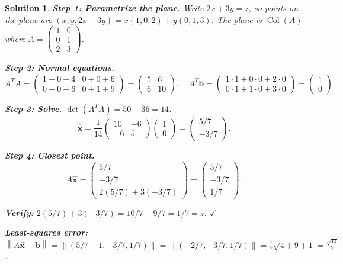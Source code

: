 \documentclass[11pt,a4paper]{article}
\theoremstyle{sol}
\newtheorem*{solution}{Solution}
\newcommand{\hx}{\hat{\mathbf{x}}}
\newcommand{\norm}[1]{\left\|#1\right\|}
\begin{document}
\begin{solution}
\textbf{Step 1: Parametrize the plane.}
Write $2x+3y=z$, so points on the plane are $(x,y,2x+3y)=x(1,0,2)+y(0,1,3)$.
The plane is $\operatorname{Col}(A)$ where $A=\begin{pmatrix}1&0\\0&1\\2&3\end{pmatrix}$.

\textbf{Step 2: Normal equations.}
\[
A^TA=\begin{pmatrix}1+0+4&0+0+6\\0+0+6&0+1+9\end{pmatrix}=\begin{pmatrix}5&6\\6&10\end{pmatrix},
\quad
A^T\mathbf{b}=\begin{pmatrix}1\cdot1+0\cdot0+2\cdot0\\0\cdot1+1\cdot0+3\cdot0\end{pmatrix}=\begin{pmatrix}1\\0\end{pmatrix}.
\]

\textbf{Step 3: Solve.}
$\det(A^TA)=50-36=14$.
\[
\hx=\frac{1}{14}\begin{pmatrix}10&-6\\-6&5\end{pmatrix}\begin{pmatrix}1\\0\end{pmatrix}=\begin{pmatrix}5/7\\-3/7\end{pmatrix}.
\]

\textbf{Step 4: Closest point.}
\[
A\hx=\begin{pmatrix}5/7\\-3/7\\2(5/7)+3(-3/7)\end{pmatrix}=\begin{pmatrix}5/7\\-3/7\\1/7\end{pmatrix}.
\]

\textbf{Verify:} $2(5/7)+3(-3/7)=10/7-9/7=1/7=z$. $\checkmark$

\textbf{Least-squares error:} $\norm{A\hx-\mathbf{b}}=\norm{(5/7-1,-3/7,1/7)}=\norm{(-2/7,-3/7,1/7)}=\frac{1}{7}\sqrt{4+9+1}=\frac{\sqrt{14}}{7}$.
\end{solution}
\end{document}
